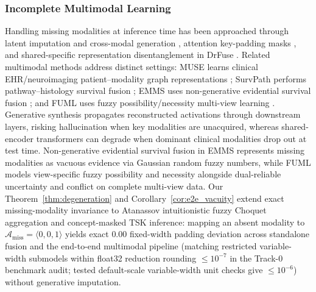 \documentclass[10pt,twocolumn]{article}
\begin{document}
\subsubsection{Incomplete Multimodal Learning}
Handling missing modalities at inference time has been approached through latent imputation and
cross-modal generation \cite{ma2021smil}, attention key-padding masks
\cite{vaswani2017attention,shaik2024survey}, and shared-specific representation
disentanglement in DrFuse \cite{yao2024drfuse}. Related multimodal methods address distinct
settings: MUSE learns clinical EHR/neuroimaging patient--modality graph representations
\cite{wu2024muse}; SurvPath performs pathway--histology survival fusion
\cite{jaume2024survpath}; EMMS uses non-generative evidential survival fusion
\cite{xing2026emms}; and FUML uses fuzzy possibility/necessity multi-view learning
\cite{duan2025fuml}. Generative synthesis \cite{ma2021smil} propagates reconstructed
activations through downstream layers, risking hallucination when key modalities are
unacquired, whereas shared-encoder transformers \cite{vaswani2017attention,yao2024drfuse} can
degrade when dominant clinical modalities drop out at test time. Non-generative evidential
survival fusion in EMMS \cite{xing2026emms} represents missing modalities as vacuous evidence
via Gaussian random fuzzy numbers, while FUML \cite{duan2025fuml} models view-specific fuzzy
possibility and necessity alongside dual-reliable uncertainty and conflict on complete
multi-view data.
Our Theorem~\ref{thm:degeneration} and Corollary~\ref{cor:e2e_vacuity} extend exact
missing-modality invariance to Atanassov intuitionistic fuzzy Choquet aggregation and
concept-masked TSK inference: mapping an absent modality to $\mathcal{A}_{\text{miss}} =
\langle 0, 0, 1\rangle$ yields exact $0.00$ fixed-width padding deviation across standalone
fusion and the end-to-end multimodal pipeline (matching restricted variable-width submodels
within float32 reduction rounding $\le 10^{-7}$ in the Track-0 benchmark audit; tested
default-scale variable-width unit checks give $\le 10^{-6}$) without generative imputation.
\end{document}
